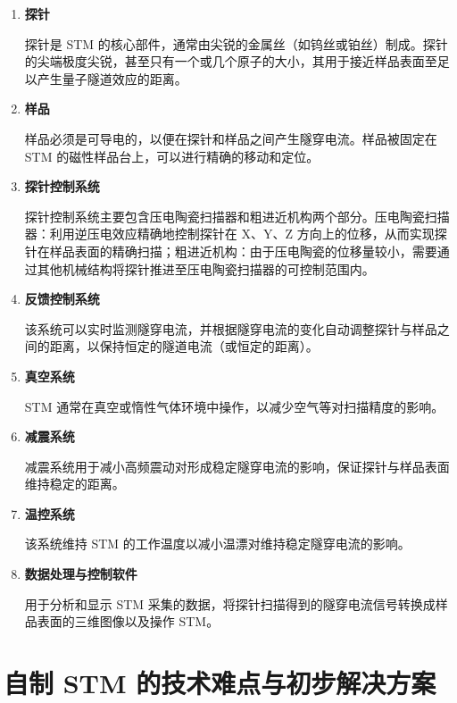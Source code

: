 \documentclass{article}
\begin{document}
\begin{enumerate}
	\item \textbf{探针}\par
	      \qquad 探针是 STM 的核心部件，通常由尖锐的金属丝（如钨丝或铂丝）制成。探针的尖端极度尖锐，甚至只有一个或几个原子的大小，其用于接近样品表面至足以产生量子隧道效应的距离。

	\item \textbf{样品}\par
	      \qquad 样品必须是可导电的，以便在探针和样品之间产生隧穿电流。样品被固定在 STM 的磁性样品台上，可以进行精确的移动和定位。

	\item \textbf{探针控制系统}\par
	      \qquad 探针控制系统主要包含压电陶瓷扫描器和粗进近机构两个部分。压电陶瓷扫描器：利用逆压电效应精确地控制探针在 X、Y、Z 方向上的位移，从而实现探针在样品表面的精确扫描；粗进近机构：由于压电陶瓷的位移量较小，需要通过其他机械结构将探针推进至压电陶瓷扫描器的可控制范围内。

	\item \textbf{反馈控制系统}\par
	      \qquad 该系统可以实时监测隧穿电流，并根据隧穿电流的变化自动调整探针与样品之间的距离，以保持恒定的隧道电流（或恒定的距离）。

	\item \textbf{真空系统}\par
	      \qquad STM 通常在真空或惰性气体环境中操作，以减少空气等对扫描精度的影响。

	\item \textbf{减震系统}\par
	      \qquad 减震系统用于减小高频震动对形成稳定隧穿电流的影响，保证探针与样品表面维持稳定的距离。

	\item \textbf{温控系统}\par
	      \qquad 该系统维持 STM 的工作温度以减小温漂对维持稳定隧穿电流的影响。

	\item \textbf{数据处理与控制软件}\par
	      \qquad 用于分析和显示 STM 采集的数据，将探针扫描得到的隧穿电流信号转换成样品表面的三维图像以及操作 STM。

\end{enumerate}

\clearpage
\section{自制 STM 的技术难点与初步解决方案}
\end{document}
